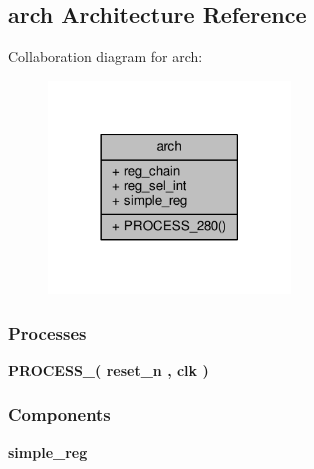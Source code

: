 \subsection{arch Architecture Reference}
\label{classphase__shift_1_1arch}


Collaboration diagram for arch\+:\nopagebreak
\begin{figure}[H]
\begin{center}
\leavevmode
\includegraphics[width=182pt]{dc/d37/classphase__shift_1_1arch__coll__graph}
\end{center}
\end{figure}
\subsubsection*{Processes}
 \begin{DoxyCompactItemize}
\item 
{\bf P\+R\+O\+C\+E\+S\+S\+\_}{\bfseries  ( {\bfseries {\bfseries {\bf reset\+\_\+n}} \textcolor{vhdlchar}{ }} , {\bfseries {\bfseries {\bf clk}} \textcolor{vhdlchar}{ }} )}
\end{DoxyCompactItemize}
\subsubsection*{Components}
 \begin{DoxyCompactItemize}
\item 
{\bf simple\+\_\+reg}  {\bfseries }  
\end{DoxyCompactItemize}
